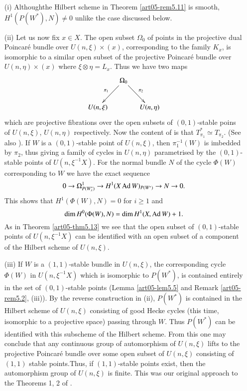 \begin{remarks}\label{art05-rems5.17}
\begin{itemize}
\item[\rm(i)] Although\pageoriginale the Hilbert scheme in
Theorem \ref{art05-rem5.11} is smooth, $H^{1}(P(W^{*}),N)\neq 0$
unlike the case discussed below.

\item[\rm(ii)] Let us now fix $x\in X$. The open subset $\Omega_{0}$
of points in the projective dual Poincar\'e bundle over
$U(n,\xi)\times (x)$, corresponding to the family $K_{x}$, is
isomorphic to a similar open subset of the projective Poincar\'e
bundle over $U(n,\eta)\times (x)$ where $\xi\otimes \eta=L_{x}$. Thus
we have two maps
\[
\xymatrix@C=.4cm{
 & \Omega_{0}\ar[dl]_-{\pi_{1}}\ar[dr]^{\pi_{2}} &\\
U(n,\xi) && U(n,\eta)
}
\]
which are projective fibrations over the open subsets of
$(0,1)$-stable poins of $U(n,\xi)$, $U(n,\eta)$ respectively. Now the
content of \cite[Proposition 4.12]{art05-key5} is that
$T^{*}_{\pi_{1}}\simeq T_{\pi_{2}}$. (See also \cite[Ch~ 5, \S\
1]{art05-key8a}). If $W$ is a $(0,1)$-stable point of $U(n,\xi)$, then
$\pi^{-1}_{1}(W)$ is imbedded by $\pi_{2}$, thus giving a family of
cycles in $U(n,\eta)$ parametrised by the $(0,1)$-stable points of
$U(n,\xi^{-1}X)$. For the normal bundle $N$ of the cycle $\Phi(W)$
corresponding to $W$ we have the exact sequence
$$
0\to \Omega^{1}_{P(W^{*}_{x})}\to H^{1}(X\operatorname{Ad} W)_{P(W^{*})}\to N\to 0.
$$
This shows that $H^{1}(\Phi(W),N)=0$ for $i\geq 1$ and 
$$
\dim
H^{0}(\Phi(W),N)=\dim H^{1}(X,\operatorname{Ad} W)+1.
$$ 
As in
Theorem \ref{art05-thm5.13} we see that the open subset of
$(0,1)$-stable points of $U(n,\xi^{-1}X)$ can be identified with an
open subset of a component of the Hilbert scheme of $U(n,\xi)$. 

\item[\rm(iii)] If $W$ is a $(1,1)$-stable bundle in $U(n,\xi)$, the
corresponding cycle $\Phi(W)$ in $U(n,\xi^{-1}X)$ which is isomorphic
to $P(W^{*})$, is contained entirely in the set of $(0,1)$-stable
points (Lemma \ref{art05-lem5.5} and Remark \ref{art05-rem5.2},
(iii)). By the reverse construction in (ii), $P(W^{*})$ is contained
in the Hilbert scheme of $U(n,\xi)$ consisting of good Hecke cycles
(this time, isomorphic to a projective space) passing through
$W$. Thus $P(W^{*})$ can be identified with this subscheme of the
Hilbert scheme. From this one may conclude that any continuous group
of automorphism of $U(n,\xi)$ lifts to the projective Poincar\'e
bundle over some open subset of $U(n,\xi)$ consisting of $(1,1)$
stable points.\pageoriginale Thus, if $(1,1)$-stable points exist,
then the automorphism group of $U(n,\xi)$ is finite. This was our
original approach to the Theorems 1, 2 of \cite{art05-key5}.
\end{itemize}
\end{remarks}

